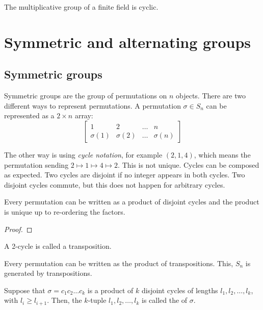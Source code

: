 \begin{corollary}
  The multiplicative group of a finite field is cyclic.
\end{corollary}

\section{Symmetric and alternating groups}

\subsection{Symmetric groups}

Symmetric groups are the group of permutations on \(n\) objects. There are two different ways to represent permutations. A permutation \(\sigma \in S_{n}\) can be represented as a \(2 \times n\) array:
\begin{equation}
  \begin{bmatrix}
    1 & 2 & \ldots & n \\
    \sigma(1) & \sigma(2) & \ldots & \sigma(n)
  \end{bmatrix}
\end{equation}

The other way is using \emph{cycle notation}, for example \((2,1,4)\), which means the permutation sending \(2 \mapsto 1 \mapsto 4 \mapsto 2\). This is not unique. Cycles can be composed as expected. Two cycles are disjoint if no integer appears in both cycles. Two disjoint cycles commute, but this does not happen for arbitrary cycles.

\begin{lemma}
  Every permutation can be written as a product of disjoint cycles and the product is unique up to re-ordering the factors.
\end{lemma}
\begin{proof}
\end{proof}

A 2-cycle is called a transposition.

\begin{lemma}
  Every permutation can be written as the product of transpositions. This, \(S_{n}\) is generated by transpositions.
\end{lemma}


\begin{definition}
  Suppose that \(\sigma = c_{1}c_{2} \ldots c_{k}\) is a product of \(k\) disjoint cycles of lengths \(l_{1}, l_{2}, \ldots, l_{k}\), with \(l_{i} \geq l_{i+1}\). Then, the \(k\)-tuple \(l_{1}, l_{2}, \ldots, l_{k}\) is called the  of \(\sigma\).
\end{definition}

